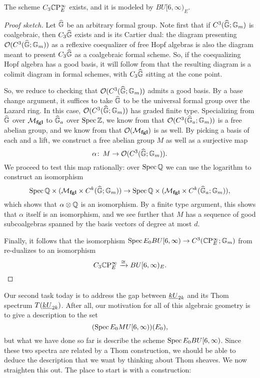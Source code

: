 \begin{theorem}
The scheme $C_3 \mathbb{C}\mathrm P^\infty_E$ exists, and it is modeled by $BU[6, \infty)_E$.
\end{theorem}
\begin{proof}[Proof sketch]
Let $\widehat{\mathbb G}$ be an arbitrary formal group.  Note first that if $C^3(\widehat{\mathbb G}; \mathbb G_m)$ is coalgebraic, then $C_3 \widehat{\mathbb G}$ exists and is its Cartier dual: the diagram presenting $\mathcal{O}(C^3(\widehat{\mathbb G}; \mathbb G_m))$ as a reflexive coequalizer of free Hopf algebras is also the diagram meant to present $C_3 \widehat{\mathbb G}$ as a coalgebraic formal scheme.  So, if the coequalizing Hopf algebra has a good basis, it will follow from  that the resulting diagram is a colimit diagram in formal schemes, with $C_3 \widehat{\mathbb G}$ sitting at the cone point.

So, we reduce to checking that $\mathcal{O}(C^3(\widehat{\mathbb G}; \mathbb G_m))$ admits a good basis.  By a base change argument, it suffices to take $\widehat{\mathbb G}$ to be the universal formal group over the Lazard ring.  In this case, $\mathcal{O}(C^3(\widehat{\mathbb G}; \mathbb G_m))$ has graded finite type.  Specializing from $\widehat{\mathbb G}$ over $\mathcal{M}_{\mathbf{fgl}}$ to $\widehat{\mathbb G}_a$ over $\operatorname{Spec} \mathbb Z$, we know from  that $\mathcal{O}(C^3(\widehat{\mathbb G}_a; \mathbb G_m))$ is a free abelian group, and we know from  that $\mathcal{O}(\mathcal{M}_{\mathbf{fgl}})$ is as well.  By picking a basis of each and a lift, we construct a free abelian group $M$ as well as a surjective map \[\alpha\colon\thinspace M \to \mathcal{O}(C^3(\widehat{\mathbb G}; \mathbb G_m)).\]  We proceed to test this map rationally: over $\operatorname{Spec} \mathbb{Q}$ we can use the logarithm to construct an isomorphism \[\operatorname{Spec} \mathbb{Q} \times (\mathcal{M}_{\mathbf{fgl}} \times C^k(\widehat{\mathbb G}; \mathbb G_m)) \to \operatorname{Spec} \mathbb{Q} \times (\mathcal{M}_{\mathbf{fgl}} \times C^k(\widehat{\mathbb G}_a; \mathbb G_m)),\] which shows that $\alpha \otimes \mathbb{Q}$ is an isomorphism.  By a finite type argument, this shows that $\alpha$ itself is an isomorphism, and we see further that $M$ has a sequence of good subcoalgebras spanned by the basis vectors of degree at most $d$.

Finally, it follows that the isomorphism $\operatorname{Spec} E_0 BU[6, \infty) \to C^3(\mathbb{C}\mathrm P^\infty_E; \mathbb G_m)$ from  re-dualizes to an isomorphism \[C_3 \mathbb{C}\mathrm P^\infty_E \xrightarrow{\cong} BU[6, \infty)_E. \qedhere\]
\end{proof}

Our second task today is to address the gap between $\underline{\smash{kU}}_{2k}$ and its Thom spectrum $T(\underline{\smash{kU}}_{2k})$.  After all, our motivation for all of this algebraic geometry is to give a description to the set \[(\operatorname{Spec} E_0 MU[6, \infty))(E_0),\] but what we have done so far is describe the scheme $\operatorname{Spec} E_0 BU[6, \infty)$.  Since these two spectra are related by a Thom construction, we should be able to deduce the description that we want by thinking about Thom sheaves.  We now straighten this out.  The place to start is with a construction:

